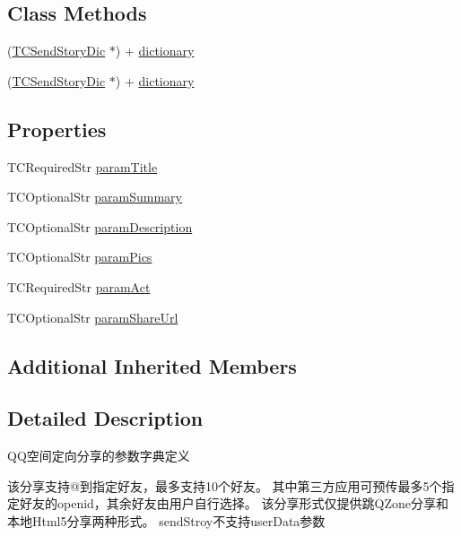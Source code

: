 \subsection*{Class Methods}
\begin{DoxyCompactItemize}
\item 
(\mbox{\hyperlink{interface_t_c_send_story_dic}{T\+C\+Send\+Story\+Dic}} $\ast$) + \mbox{\hyperlink{interface_t_c_send_story_dic_afaf8aea377547c5de261af7064c00b98}{dictionary}}
\item 
(\mbox{\hyperlink{interface_t_c_send_story_dic}{T\+C\+Send\+Story\+Dic}} $\ast$) + \mbox{\hyperlink{interface_t_c_send_story_dic_afaf8aea377547c5de261af7064c00b98}{dictionary}}
\end{DoxyCompactItemize}
\subsection*{Properties}
\begin{DoxyCompactItemize}
\item 
T\+C\+Required\+Str \mbox{\hyperlink{interface_t_c_send_story_dic_a50bde2af9cf463544fe1499c25b15fab}{param\+Title}}
\item 
T\+C\+Optional\+Str \mbox{\hyperlink{interface_t_c_send_story_dic_a07dcb7266c719afe600ada472aa8c918}{param\+Summary}}
\item 
T\+C\+Optional\+Str \mbox{\hyperlink{interface_t_c_send_story_dic_a742aa540ab93c3736b88d7a079d04ce9}{param\+Description}}
\item 
T\+C\+Optional\+Str \mbox{\hyperlink{interface_t_c_send_story_dic_a90aea2f54e6d722cbefd77dd5149d8ae}{param\+Pics}}
\item 
T\+C\+Required\+Str \mbox{\hyperlink{interface_t_c_send_story_dic_a91fc1d35a7f4100ca5ca7e799e04d3d3}{param\+Act}}
\item 
T\+C\+Optional\+Str \mbox{\hyperlink{interface_t_c_send_story_dic_a82a00a62bc41e220b0144d5e8549b238}{param\+Share\+Url}}
\end{DoxyCompactItemize}
\subsection*{Additional Inherited Members}


\subsection{Detailed Description}
Q\+Q空间定向分享的参数字典定义 

该分享支持@到指定好友，最多支持10个好友。 其中第三方应用可预传最多5个指定好友的openid，其余好友由用户自行选择。 该分享形式仅提供跳\+Q\+Zone分享和本地\+Html5分享两种形式。 send\+Stroy不支持user\+Data参数 

